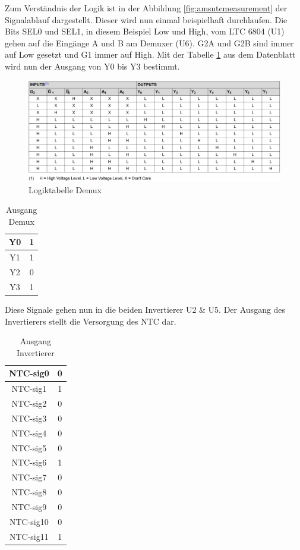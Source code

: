 Zum Verständnis der Logik ist in der Abbildung \ref{fig:amsntcmeasurement} der Signalablauf dargestellt. Dieser wird nun einmal beispielhaft durchlaufen. Die Bits SEL0 und SEL1, in diesem Beispiel Low und High, vom LTC 6804 (U1) gehen auf die Eingänge A und B am Demuxer (U6). G2A und G2B sind immer auf Low gesetzt und G1 immer auf High. Mit der Tabelle \ref{Demuxer_Logiktabelle} aus dem Datenblatt wird nun der Ausgang von Y0 bis Y3 bestimmt.

\begin{figure}
	\centering
	\includegraphics[width=0.5\linewidth]{bilder/AMS_demuxer_logiktabelle}
	\caption{Logiktabelle Demux \cite{SN74HCS238}}
	\label{Demuxer_Logiktabelle}
\end{figure}

\FloatBarrier
\begin{table}
	\centering
	\caption{Ausgang Demux}
	\begin{tabular}{|c|c|}
		\hline
		Y0 & 1 \\
		\hline
		Y1 & 1 \\
		\hline
		Y2 & 0 \\
		\hline
		Y3 & 1 \\
		\hline
	\end{tabular}
\end{table}

Diese Signale gehen nun in die beiden Invertierer U2 \& U5. Der Ausgang des Invertierers stellt die Versorgung des \ac{NTC} dar.

\begin{table}
	\centering
	\caption{Ausgang Invertierer}
	\begin{tabular}{|c|c|}
		\hline
		NTC-sig0 & 0 \\
		\hline
		NTC-sig1 & 1 \\
		\hline
		NTC-sig2 & 0 \\
		\hline
		NTC-sig3 & 0 \\
		\hline
		NTC-sig4 & 0 \\
		\hline
		NTC-sig5 & 0 \\
		\hline
		NTC-sig6 & 1 \\
		\hline
		NTC-sig7 & 0 \\
		\hline
		NTC-sig8 & 0 \\
		\hline
		NTC-sig9 & 0 \\
		\hline
		NTC-sig10 & 0 \\
		\hline
		NTC-sig11 & 1 \\
		\hline
	\end{tabular}
\end{table}

